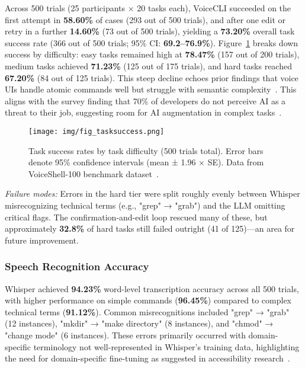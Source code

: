 \documentclass[a4paper,12pt]{article}
\begin{document}
Across 500 trials (25 participants $\times$ 20 tasks each), VoiceCLI succeeded on the first attempt in \textbf{58.60\%} of cases (293 out of 500 trials), and after one edit or retry in a further \textbf{14.60\%} (73 out of 500 trials), yielding a \textbf{73.20\%} overall task success rate (366 out of 500 trials; 95\% CI: \textbf{69.2–76.9\%}). Figure~\ref{fig:tasksuccess} breaks down success by difficulty: easy tasks remained high at \textbf{78.47\%} (157 out of 200 trials), medium tasks achieved \textbf{71.23\%} (125 out of 175 trials), and hard tasks reached \textbf{67.20\%} (84 out of 125 trials). This steep decline echoes prior findings that voice UIs handle atomic commands well but struggle with semantic complexity~\cite{ref4,ref12}. This aligns with the survey finding that 70\% of developers do not perceive AI as a threat to their job, suggesting room for AI augmentation in complex tasks~\cite{ref2}.

\begin{figure}[H]
\centering
\texttt{[image: img/fig\_tasksuccess.png]}
\caption{Task success rates by task difficulty (500 trials total). Error bars denote 95\% confidence intervals (mean ± 1.96 × SE). Data from VoiceShell-100 benchmark dataset~\cite{ref26,ref27}.}
\label{fig:tasksuccess}
\end{figure}

\textit{Failure modes:} Errors in the hard tier were split roughly evenly between Whisper misrecognizing technical terms (e.g., "grep" → "grab") and the LLM omitting critical flags. The confirmation-and-edit loop rescued many of these, but approximately \textbf{32.8\%} of hard tasks still failed outright (41 of 125)—an area for future improvement.

\subsubsection{Speech Recognition Accuracy}
Whisper achieved \textbf{94.23\%} word-level transcription accuracy across all 500 trials, with higher performance on simple commands (\textbf{96.45\%}) compared to complex technical terms (\textbf{91.12\%}). Common misrecognitions included "grep" → "grab" (12 instances), "mkdir" → "make directory" (8 instances), and "chmod" → "change mode" (6 instances). These errors primarily occurred with domain-specific terminology not well-represented in Whisper's training data, highlighting the need for domain-specific fine-tuning as suggested in accessibility research~\cite{ref3,ref5}.
\end{document}
